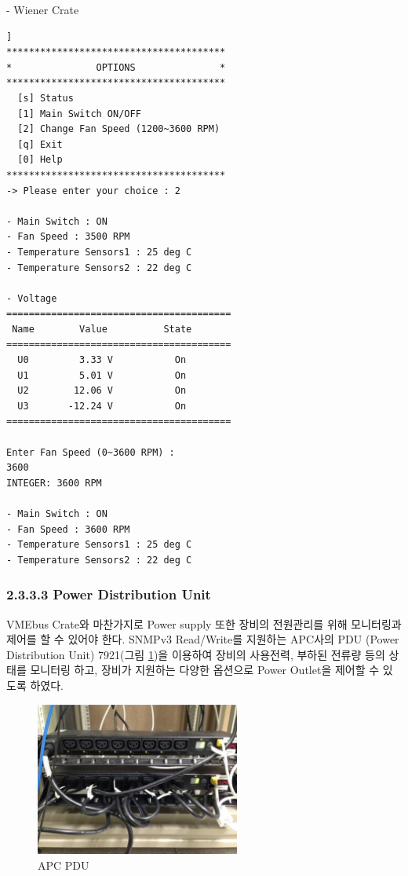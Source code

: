 \documentclass[11pt
  , a4paper
  , article
  , oneside
]{memoir}
\begin{document}
\clearpage
- Wiener Crate
\begin{lstlisting}[style=termstyle, caption=Wiener Crate 모니터링 및 제어결과]]
***************************************
*               OPTIONS               *
***************************************
  [s] Status                           
  [1] Main Switch ON/OFF               
  [2] Change Fan Speed (1200~3600 RPM) 
  [q] Exit                             
  [0] Help                             
***************************************
-> Please enter your choice : 2

- Main Switch : ON
- Fan Speed : 3500 RPM
- Temperature Sensors1 : 25 deg C
- Temperature Sensors2 : 22 deg C

- Voltage
========================================
 Name        Value          State
========================================
  U0         3.33 V           On
  U1         5.01 V           On
  U2        12.06 V           On
  U3       -12.24 V           On
========================================

Enter Fan Speed (0~3600 RPM) : 
3600
INTEGER: 3600 RPM

- Main Switch : ON
- Fan Speed : 3600 RPM
- Temperature Sensors1 : 25 deg C
- Temperature Sensors2 : 22 deg C
\end{lstlisting}

\clearpage
\subsubsection{2.3.3.3 Power Distribution Unit}
VMEbus Crate와 마찬가지로 Power supply 또한 장비의 전원관리를 위해 모니터링과 제어를 할 수 있어야 한다. SNMPv3 Read/Write를 지원하는 APC사의 PDU (Power Distribution Unit) 7921(그림 \ref{fig:apc_pdu})을 이용하여 장비의 사용전력, 부하된 전류량 등의 상태를 모니터링 하고, 장비가 지원하는 다양한 옵션으로 Power Outlet을 제어할 수 있도록 하였다.
\begin{figure}[h]
  \centering
  \includegraphics[width=0.6\textwidth]{./images/apc_pdu.eps}
  \caption{APC PDU}
  \label{fig:apc_pdu}   
\end{figure}
\end{document}
